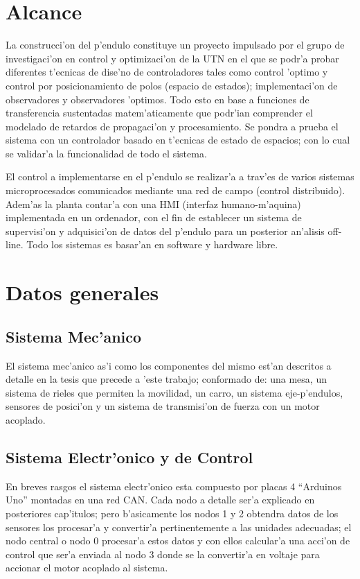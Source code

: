 \section{Alcance}


La construcci'on del p'endulo constituye un proyecto impulsado por el grupo de investigaci'on en control y optimizaci'on de la UTN en el que se podr'a probar diferentes t'ecnicas de dise'no de controladores tales como control 'optimo y control por posicionamiento de polos (espacio de estados);  implementaci'on de observadores y observadores 'optimos. Todo esto en base a funciones de transferencia sustentadas matem'aticamente que podr'ian comprender el modelado de retardos de propagaci'on y procesamiento. Se pondra a prueba el sistema con un controlador basado en t'ecnicas de estado de espacios; con lo cual se validar'a la funcionalidad de todo el sistema.


El control a implementarse en el p'endulo se realizar'a a trav'es de varios sistemas microprocesados comunicados mediante una red de campo (control distribuido).
Adem'as la planta contar'a con una HMI (interfaz humano-m'aquina) implementada en un ordenador, con el fin de establecer un sistema de supervisi'on y adquisici'on de datos del p'endulo para un posterior an'alisis off-line. Todo los sistemas es basar'an en software y hardware libre.

\section{Datos generales}
\subsection{Sistema Mec'anico}
El sistema mec'anico as'i como los componentes del mismo est'an descritos a detalle en la tesis que precede a 'este trabajo; conformado de: una mesa, un sistema de rieles que permiten la movilidad, un carro, un sistema eje-p'endulos, sensores de posici'on y un sistema de transmisi'on de fuerza con un motor acoplado.

\subsection{Sistema Electr'onico y de Control}
En breves rasgos el sistema electr'onico esta compuesto por placas 4 ``Arduinos Uno'' montadas en una red CAN. Cada nodo a detalle ser'a explicado en posteriores cap'itulos; pero b'asicamente los nodos 1 y 2 obtendra datos de los sensores los procesar'a y convertir'a pertinentemente a las unidades adecuadas; el nodo central o nodo 0 procesar'a estos datos y con ellos calcular'a una acci'on de control que ser'a enviada al nodo 3 donde se la convertir'a en voltaje para accionar el motor acoplado al sistema.